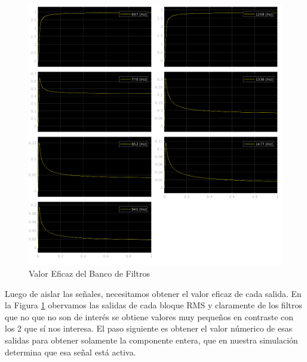 \begin{figure}[!htb]
  \centering
  \includegraphics[width=\linewidth]{images/simulacion/extendido/rms.png}
  \caption{Valor Eficaz del Banco de Filtros}
  \label{fig:sim_rms}
\end{figure}

Luego de aislar las señales, necesitamos obtener el valor eficaz de cada salida. En la Figura \ref{fig:sim_rms} obervamos las salidas de cada bloque RMS y claramente de los filtros que no que no son de interés se obtiene valores muy pequeños en contraste con los 2 que sí nos interesa. El paso siguiente es obtener el valor númerico de esas salidas para obtener solamente la componente entera, que en nuestra simulación determina que esa señal está activa.

